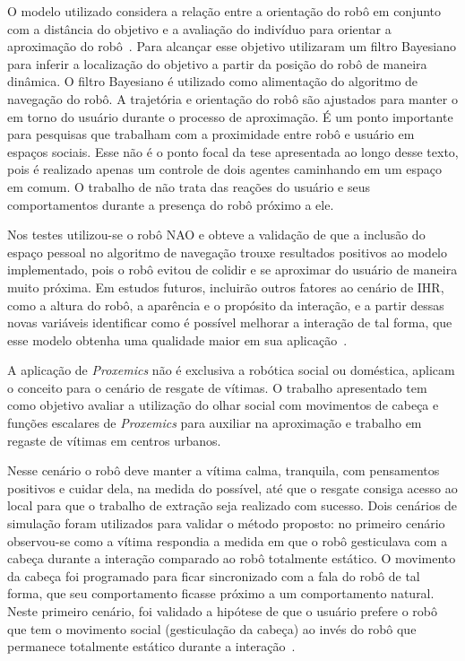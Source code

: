 O modelo utilizado considera a relação entre a orientação do robô em conjunto com a distância do objetivo e a avaliação do indivíduo para orientar a aproximação do robô~\cite{torta:2011}. Para alcançar esse objetivo \textcite{torta:2011} utilizaram um filtro Bayesiano para inferir a localização do objetivo a partir da posição do robô de maneira dinâmica. O filtro Bayesiano é utilizado como alimentação do algoritmo de navegação do robô. A trajetória e orientação do robô são ajustados para manter o em torno do usuário durante o processo de aproximação. É um ponto importante para pesquisas que trabalham com a proximidade entre robô e usuário em espaços sociais. Esse não é o ponto focal da tese apresentada ao longo desse texto, pois é realizado apenas um controle de dois agentes caminhando em um espaço em comum. O trabalho de \textcite{torta:2011} não trata das reações do usuário e seus comportamentos durante a presença do robô próximo a ele.

Nos testes utilizou-se o robô NAO e obteve a validação de que a inclusão do espaço pessoal no algoritmo de navegação trouxe resultados positivos ao modelo implementado, pois o robô evitou de colidir e se aproximar do usuário de maneira muito próxima. Em estudos futuros, \textcite{torta:2011} incluirão outros fatores ao cenário de IHR, como a altura do robô, a aparência e o propósito da interação, e a partir dessas novas variáveis identificar como é possível melhorar a interação de tal forma, que esse modelo obtenha uma qualidade maior em sua aplicação~\cite{torta:2011}.

A aplicação de \emph{Proxemics} não é exclusiva a robótica social ou doméstica, \textcite{srinivasan:2012} aplicam o conceito para o cenário de resgate de vítimas. O trabalho apresentado tem como objetivo avaliar a utilização do olhar social com movimentos de cabeça e funções escalares de \emph{Proxemics} para auxiliar na aproximação e trabalho em regaste de vítimas em centros urbanos.

Nesse cenário o robô deve manter a vítima calma, tranquila, com pensamentos positivos e cuidar dela, na medida do possível, até que o resgate consiga acesso ao local para que o trabalho de extração seja realizado com sucesso. Dois cenários de simulação foram utilizados para validar o método proposto: no primeiro cenário observou-se como a vítima respondia a medida em que o robô gesticulava com a cabeça durante a interação comparado ao robô totalmente estático. O movimento da cabeça foi programado para ficar sincronizado com a fala do robô de tal forma, que seu comportamento ficasse próximo a um comportamento natural. Neste primeiro cenário, foi validado a hipótese de que o usuário prefere o robô que tem o movimento social (gesticulação da cabeça) ao invés do robô que permanece totalmente estático durante a interação~\cite{srinivasan:2012}.

